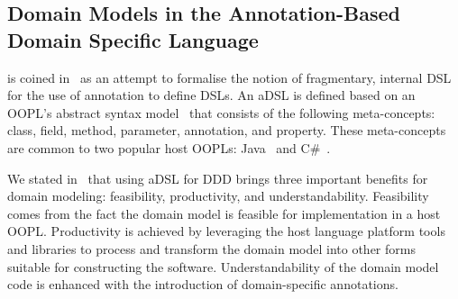 
\subsection{Domain Models in the Annotation-Based Domain Specific Language \dcsl}
\label{sect:bg-dcsl}

 is coined in~\cite{nosal_language_2016} as an attempt to formalise the notion of fragmentary, internal DSL~\cite{fowler_domain-specific_2010} for the use of annotation to define DSLs. An aDSL is defined based on an OOPL's abstract syntax model~\cite{le_domain_2018} that consists of the following meta-concepts: class, field, method, parameter, annotation, and property. These meta-concepts are common to two popular host OOPLs: Java~\cite{gosling_java_2014} and C\#~\cite{hejlsberg_c_2010}.

%
We stated in~\cite{le_domain_2018} that using aDSL for DDD brings three important benefits for domain modeling: feasibility, productivity, and understandability. Feasibility comes from the fact the domain model is feasible for implementation in a host OOPL. Productivity is achieved by leveraging the host language platform tools and libraries to process and transform the domain model into other forms suitable for constructing the software. Understandability of the domain model code is enhanced with the introduction of domain-specific annotations.


